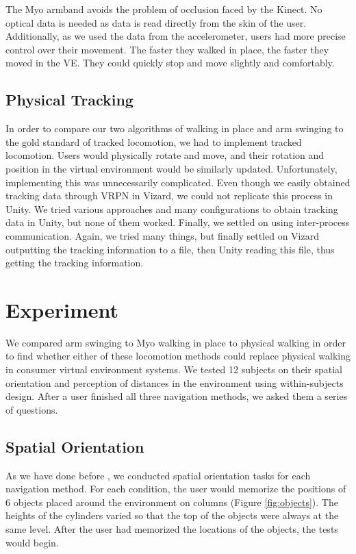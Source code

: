 \documentclass[titlepage]{article}
\theoremstyle{definition}
\theoremstyle{proof}
\begin{document}
The Myo armband avoids the problem of occlusion faced by the Kinect.
No optical data is needed as data is read directly from the skin of the user.
Additionally, as we used the data from the accelerometer,
users had more precise control over their movement.
The faster they walked in place, the faster they moved in the VE.
They could quickly stop and move slightly and comfortably.

\subsection{Physical Tracking}
In order to compare our two algorithms of walking in place and arm swinging to the gold standard of tracked locomotion,
we had to implement tracked locomotion.
Users would physically rotate and move,
and their rotation and position in the virtual environment would be similarly updated.
Unfortunately, implementing this was unnecessarily complicated.
Even though we easily obtained tracking data through VRPN in Vizard,
we could not replicate this process in Unity.
We tried various approaches and many configurations to obtain tracking data in Unity,
but none of them worked.
Finally, we settled on using inter-process communication.
Again, we tried many things,
but finally settled on Vizard outputting the tracking information to a file,
then Unity reading this file, thus getting the tracking information.

\newpage
\section{Experiment}
We compared arm swinging to Myo walking in place to physical walking
in order to find whether either of these locomotion methods could replace physical walking
in consumer virtual environment systems.
We tested 12 subjects on their spatial orientation and perception of distances in the environment
using within-subjects design.
After a user finished all three navigation methods,
we asked them a series of questions.

\subsection{Spatial Orientation}
As we have done before \cite{Wilson:2014,Williams:2011:EWP},
we conducted spatial orientation tasks for each navigation method.
For each condition, the user would memorize the positions of 6 objects
placed around the environment on columns (Figure \ref{fig:objects}).
The heights of the cylinders varied so that the top of the objects were always at the same level.
After the user had memorized the locations of the objects,
the tests would begin.
\end{document}
